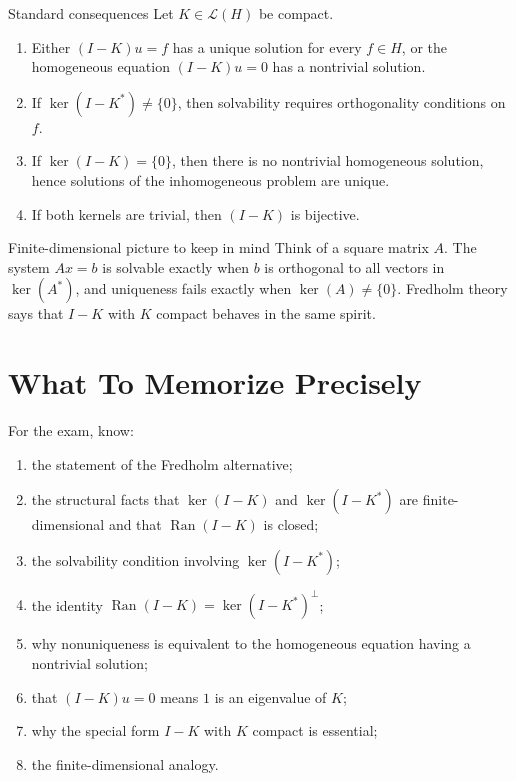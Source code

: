 \documentclass[11pt]{article}
\begin{document}
\begin{thmbox}{Standard consequences}
Let $K\in\mathcal L(H)$ be compact.
\begin{enumerate}
\item Either $(I-K)u=f$ has a unique solution for every $f\in H$, or the homogeneous equation $(I-K)u=0$ has a nontrivial solution.
\item If $\ker(I-K^*)\neq\{0\}$, then solvability requires orthogonality conditions on $f$.
\item If $\ker(I-K)=\{0\}$, then there is no nontrivial homogeneous solution, hence solutions of the inhomogeneous problem are unique.
\item If both kernels are trivial, then $(I-K)$ is bijective.
\end{enumerate}
\end{thmbox}

\begin{exbox}{Finite-dimensional picture to keep in mind}
Think of a square matrix $A$. The system $Ax=b$ is solvable exactly when $b$ is orthogonal to all vectors in $\ker(A^*)$, and uniqueness fails exactly when $\ker(A)\neq\{0\}$. Fredholm theory says that $I-K$ with $K$ compact behaves in the same spirit.
\end{exbox}

\section{What To Memorize Precisely}

\begin{focusbox}
For the exam, know:
\begin{enumerate}
\item the statement of the Fredholm alternative;
\item the structural facts that $\ker(I-K)$ and $\ker(I-K^*)$ are finite-dimensional and that $\operatorname{Ran}(I-K)$ is closed;
\item the solvability condition involving $\ker(I-K^*)$;
\item the identity $\operatorname{Ran}(I-K)=\ker(I-K^*)^{\perp}$;
\item why nonuniqueness is equivalent to the homogeneous equation having a nontrivial solution;
\item that $(I-K)u=0$ means $1$ is an eigenvalue of $K$;
\item why the special form $I-K$ with $K$ compact is essential;
\item the finite-dimensional analogy.
\end{enumerate}
\end{focusbox}
\end{document}
